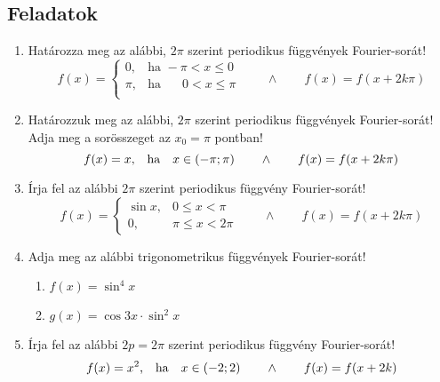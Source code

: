 \documentclass[a4paper, 12pt]{scrartcl}
\begin{document}
\subsection{Feladatok}
\begin{enumerate}
  \item Határozza meg az alábbi, $2\pi$ szerint periodikus függvények
        Fourier-sorát!
        $$
          f(x)
          =
          \begin{cases}
            0,   & \text{ha } -\pi < x \leq 0            \\
            \pi, & \text{ha } \phantom-\, 0 < x \leq \pi \\
          \end{cases}
          \qquad \land \qquad
          f(x) = f(x + 2k\pi)
        $$

  \item Határozzuk meg az alábbi, $2\pi$ szerint periodikus függvények
        Fourier-sorát! Adja meg a sorösszeget az $x_0 = \pi$ pontban!
        $$
          f(x) = x \text{,\quad{ha}\quad{}} x \in (-\pi; \pi)
          \qquad \land \qquad
          f(x) = f(x + 2k\pi)
        $$

  \item Írja fel az alábbi $2\pi$ szerint periodikus függvény Fourier-sorát!
        $$
          f(x) = \begin{cases}
            \sin x, & 0 \leq x < \pi    \\
            0,      & \pi \leq x < 2\pi
          \end{cases}
          \qquad \land \qquad
          f(x) = f(x + 2k\pi)
        $$

  \item Adja meg az alábbi trigonometrikus függvények Fourier-sorát!
        \begin{multicols}{2}
          \begin{enumerate}
            \item $f(x) = \sin^4 x$
            \item $g(x) = \cos 3x \cdot \sin^2 x$
          \end{enumerate}
        \end{multicols}

  \item Írja fel az alábbi $2p = 2\pi$ szerint periodikus függvény
        Fourier-sorát!
        $$
          f(x) = x^2
          \text{,\quad{ha}\quad{}} x \in (-2; 2)
          \qquad \land \qquad
          f(x) = f(x + 2k)
        $$


\end{enumerate}
\end{document}
